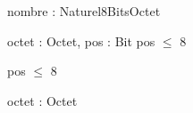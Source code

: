 \begin{algorithme}
        
        {nombre : Naturel8Bits}{Octet}
        {}

        {octet : Octet, pos : \naturelNonNul}{Bit}
        {pos $\leq$ 8}
    
        {
        }
        {pos $\leq$ 8}
    
        {octet : Octet}{\naturel}
        {}
\end{algorithme}
 
